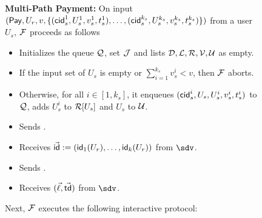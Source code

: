 \begin{figure*}[!t]
{{%

\textbf{Multi-Path Payment:} On input $(\mathsf{Pay}, U_r, v, \{(\mathsf{cid}_s^1, U_s^1,v_s^1,t_s^1),
\ldots,(\mathsf{cid}_s^{k_s}, U_s^{k_s},v_s^{k_s},t_s^{k_s})\})$ from a user $U_s$, $\mathcal{F}$ proceeds 
as follows 
\begin{itemize}[label=-]
	\item Initializes the queue $\mathcal{Q}$, set $\mathcal{J}$ and lists $\mathcal{D}, \mathcal{L}, \mathcal{R}, \mathcal{V}, \mathcal{U}$ as empty.
	\item If the input set of $U_s$ is empty or $\textstyle\sum_{i=1}^{k_s} v_s^i < v$, then 
	$\mathcal{F}$ aborts.
	\item Otherwise, for all $i \in [1,k_s]$, it enqueues $(\mathsf{cid}_s^i, U_s,U_s^i,v_s^i,t_s^i)$ 
	to $\mathcal{Q}$, adds $U_s^i$ to $\mathcal{R}[U_s]$ and $U_s$ to $\mathcal{U}$.
	\item Sends .
	\item Receives $\vec{\mathsf{id}} := (\mathsf{id}_1(U_r),\ldots,\mathsf{id}_k(U_r))$ from $\sdv$.
	\item Sends .
	\item Receives $(\vec{\ell},\vec{\mathsf{td}})$ from $\sdv$.
\end{itemize}

Next, $\mathcal{F}$ executes the following interactive protocol:

\begin{enumerate}
	

\end{enumerate}}}
\end{figure*}
